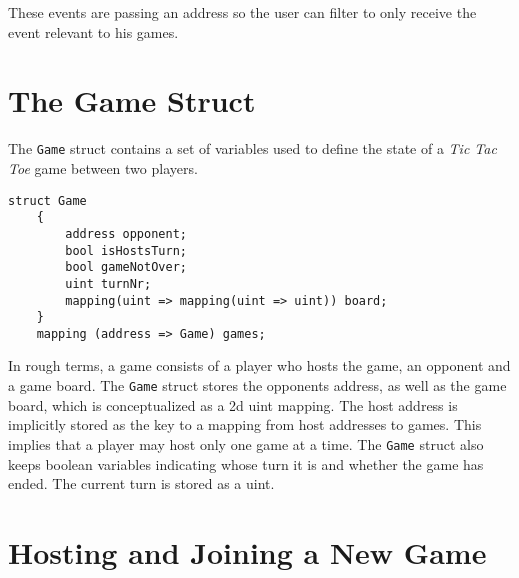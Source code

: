 \documentclass[10pt]{article}
\begin{document}
These events are passing an address so the user can filter to only receive the event relevant to his games. 

\section{The Game Struct}

The \texttt{Game} struct contains a set of variables used to define the state of a \emph{Tic Tac Toe} game between two players.

\begin{Verbatim}[fontsize=\small]
    struct Game
    {
        address opponent;
        bool isHostsTurn;
        bool gameNotOver;
        uint turnNr;
        mapping(uint => mapping(uint => uint)) board;
    }
    mapping (address => Game) games;
\end{Verbatim}

In rough terms, a game consists of a player who hosts the game, an opponent and a game board. The \texttt{Game} struct stores the opponents address, as well as the game board, which is conceptualized as a 2d uint mapping. The host address is implicitly stored as the key to a mapping from host addresses to games. This implies that a player may host only one game at a time. The \texttt{Game} struct also keeps boolean variables indicating whose turn it is and whether the	 game has ended. The current turn is stored as a uint.

\section{Hosting and Joining a New Game}
\end{document}

